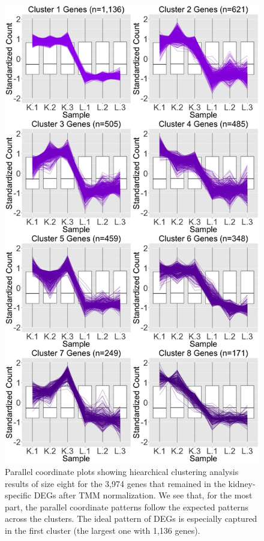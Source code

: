 \documentclass{article}
\begin{document}
\null
\begin{figure}[t!]
\centerline{\includegraphics[width=0.65\columnwidth]{../Bioinformatics/Pictures/liverKidney/Clustering_data_FDR_001_TMMvRaw_Keep/K_L_8.jpg}}
\caption{Parallel coordinate plots showing hiearchical clustering analysis results of size eight for the 3,974 genes that remained in the kidney-specific DEGs after TMM normalization. We see that, for the most part, the parallel coordinate patterns follow the expected patterns across the clusters. The ideal pattern of DEGs is especially captured in the first cluster (the largest one with 1,136 genes).
\label{KeepPCP}}
\end{figure}
\end{document}
